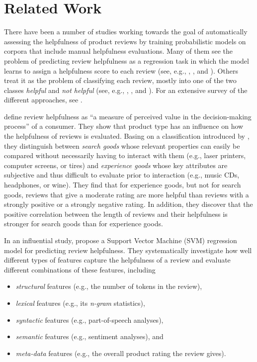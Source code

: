 \documentclass[
    a4paper,%
    12pt,%
    oneside,%
    toc=bibliography,
    final,
]{scrartcl}
\begin{document}
\section{Related Work}
\label{sec:related-work}

There have been a number of studies working towards the goal of automatically assessing the helpfulness of product reviews by training probabilistic models on corpora that include manual helpfulness evaluations. Many of them see the problem of predicting review helpfulness as a regression task in which the model learns to assign a helpfulness score to each review (see, e.g., \citealt{Kim2006}, \citealt{ZhangVaradarajan2006}, and \citealt{SieringMuntermann2013}). Others treat it as the problem of classifying each review, mostly into one of the two classes \textit{helpful} and \textit{not helpful} (see, e.g., \citealt{ChenTseng2011}, \citealt{Mertz2014}, and \citealt{Zhang2015}). For an extensive survey of the different approaches, see \citet{Almagrabi2015}.

\citet[186]{MudambiSchuff2010} define review helpfulness as “a measure of perceived value in the decision-making process” of a consumer. They show that product type has an influence on how the helpfulness of reviews is evaluated. Basing on a classification introduced by \citet{Nelson1970}, they distinguish between \textit{search goods} whose relevant properties can easily be compared without necessarily having to interact with them (e.g., laser printers, computer screens, or tires) and \textit{experience goods} whose key attributes are subjective and thus difficult to evaluate prior to interaction (e.g., music CDs, headphones, or wine). They find that for experience goods, but not for search goods, reviews that give a moderate rating are more helpful than reviews with a strongly positive or a strongly negative rating. In addition, they discover that the positive correlation between the length of reviews and their helpfulness is stronger for search goods than for experience goods.

In an influential study, \citet{Kim2006} propose a Support Vector Machine (SVM) regression model for predicting review helpfulness. They systematically investigate how well different types of features capture the helpfulness of a review and evaluate different combinations of these features, including

\begin{itemize}
\item \textit{structural} features (e.g., the number of tokens in the review),
\item \textit{lexical} features (e.g., its \textit{n-gram} statistics),
\item \textit{syntactic} features (e.g., part-of-speech analyses),
\item \textit{semantic} features (e.g., sentiment analyses), and
\item \textit{meta-data} features (e.g., the overall product rating the review gives).
\end{itemize}
\end{document}
